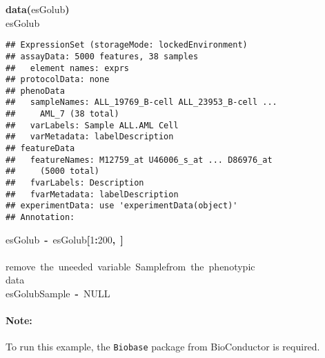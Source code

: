 \documentclass[a4paper]{article}\usepackage{graphicx, color}
\makeatletter
\newcommand{\hlnumber}[1]{\textcolor[rgb]{0,0,0}{#1}}%
\newcommand{\hlfunctioncall}[1]{\textcolor[rgb]{0.501960784313725,0,0.329411764705882}{\textbf{#1}}}%
\newcommand{\hlkeyword}[1]{\textcolor[rgb]{0,0,0}{\textbf{#1}}}%
\newcommand{\hlcomment}[1]{\textcolor[rgb]{0.180392156862745,0.6,0.341176470588235}{#1}}%
\newcommand{\hlassignement}[1]{\textcolor[rgb]{0,0,0}{\textbf{#1}}}%
\newcommand{\hlsymbol}[1]{\textcolor[rgb]{0,0,0}{#1}}%
\newcommand{\hlstd}[1]{\textcolor[rgb]{0,0,0}{#1}}%
\newenvironment{kframe}{%
 \def\FrameCommand##1{\hskip\@totalleftmargin \hskip-\fboxsep
 \colorbox{shadecolor}{##1}\hskip-\fboxsep
     \hskip-\linewidth \hskip-\@totalleftmargin \hskip\columnwidth}%
 \MakeFramed {\advance\hsize-\width
   \@totalleftmargin\z@ \linewidth\hsize
   \@setminipage}}%
 {\par\unskip\endMakeFramed}
\newenvironment{knitrout}{}{} %
\let\code=\texttt
\makeatother
\begin{document}
\begin{knitrout}
\color{fgcolor}\begin{kframe}
\begin{flushleft}
\ttfamily\noindent
\hlfunctioncall{data}\hlkeyword{(}\hlsymbol{esGolub}\hlkeyword{)}\hspace*{\fill}\\
\hlstd{}\hlsymbol{esGolub}\mbox{}
\normalfont
\end{flushleft}
\begin{verbatim}
## ExpressionSet (storageMode: lockedEnvironment)
## assayData: 5000 features, 38 samples 
##   element names: exprs 
## protocolData: none
## phenoData
##   sampleNames: ALL_19769_B-cell ALL_23953_B-cell ...
##     AML_7 (38 total)
##   varLabels: Sample ALL.AML Cell
##   varMetadata: labelDescription
## featureData
##   featureNames: M12759_at U46006_s_at ... D86976_at
##     (5000 total)
##   fvarLabels: Description
##   fvarMetadata: labelDescription
## experimentData: use 'experimentData(object)'
## Annotation:  
\end{verbatim}
\begin{flushleft}
\ttfamily\noindent
\hlsymbol{esGolub}{\ }\hlassignement{\usebox{\hlnormalsizeboxlessthan}-}{\ }\hlsymbol{esGolub}\hlkeyword{[}\hlnumber{1}\hlkeyword{:}\hlnumber{200}\hlkeyword{,}{\ }\hlkeyword{]}\hspace*{\fill}\\
\hlstd{}\hspace*{\fill}\\
\hlstd{}\hlcomment{\usebox{\hlnormalsizeboxhash}{\ }remove{\ }the{\ }uneeded{\ }variable{\ }\usebox{\hlnormalsizeboxsinglequote}Sample\usebox{\hlnormalsizeboxsinglequote}{\ }from{\ }the{\ }phenotypic}\hspace*{\fill}\\
\hlstd{}\hlcomment{\usebox{\hlnormalsizeboxhash}{\ }data}\hspace*{\fill}\\
\hlstd{}\hlsymbol{esGolub}\hlkeyword{\usebox{\hlnormalsizeboxdollar}}\hlsymbol{Sample}{\ }\hlassignement{\usebox{\hlnormalsizeboxlessthan}-}{\ }NULL\mbox{}
\normalfont
\end{flushleft}
\end{kframe}
\end{knitrout}


\paragraph{Note:} To run this example, the \code{Biobase} package from BioConductor is required.
\end{document}
